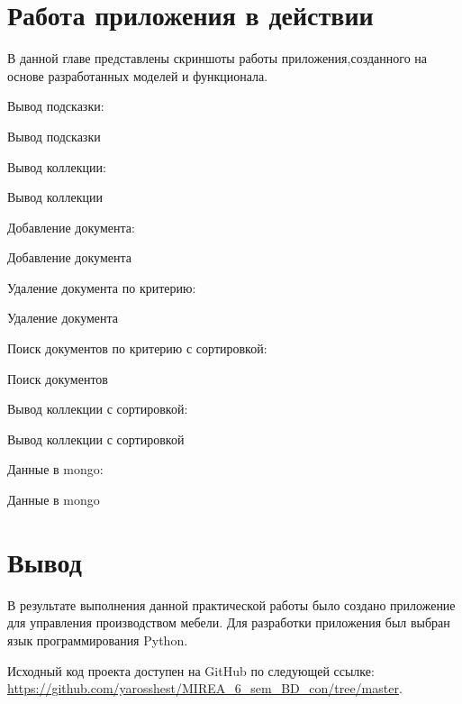 \section{Работа приложения в действии}

В данной главе представлены скриншоты работы приложения,созданного на основе разработанных моделей и функционала.

Вывод подсказки:

\begin{image}
    \caption{Вывод подсказки}
    \label{fig:help}
\end{image}

Вывод коллекции:

\begin{image}
    \caption{Вывод коллекции}
    \label{fig:show}
\end{image}

\clearpage

Добавление документа:

\begin{image}
    \caption{Добавление документа}
    \label{fig:new}
\end{image}

\clearpage
Удаление документа по критерию:

\begin{image}
    \caption{Удаление документа}
    \label{fig:del}
\end{image}

Поиск документов по критерию с сортировкой:

\begin{image}
    \caption{Поиск документов}
    \label{fig:showWith}
\end{image}
\clearpage

Вывод коллекции с сортировкой:

\begin{image}
    \caption{Вывод коллекции с сортировкой}
    \label{fig:showSort}
\end{image}

\clearpage
Данные в mongo:
\begin{image}
    \caption{Данные в mongo}
    \label{fig:inmongo}
\end{image}

\section*{\LARGE Вывод}

В результате выполнения данной практической работы было создано
приложение для управления производством мебели.
Для разработки приложения был выбран язык программирования Python.\par
Исходный код проекта доступен на GitHub по следующей ссылке:
\url{https://github.com/yarosshest/MIREA_6_sem_BD_con/tree/master}.